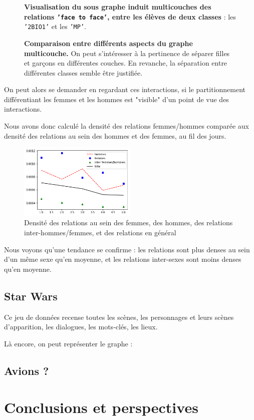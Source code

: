 \documentclass[11pt,a4paper]{article}
\theoremstyle{definition}
\theoremstyle{remark}
\theoremstyle{remark}
\begin{document}
\begin{figure}[H]
\begin{minipage}[t]{0.48\textwidth}
		\captionsetup{margin=10pt}
		\caption{\textbf{Visualisation du sous graphe induit multicouches des relations \texttt{'face to face'}, entre les élèves de deux classes} : les \texttt{'2BIO1'} et les \texttt{'MP'}.}
	\end{minipage}
	\label{induit}
	\caption{\textbf{Comparaison entre différents aspects du graphe multicouche. } On peut s'intéresser à la pertinence de séparer filles et garçons en différentes couches. En revanche, la séparation entre différentes classes semble être justifiée.}
\end{figure}
	
	On peut alors se demander en regardant ces interactions, si le partitionnement différentiant les femmes et les hommes est "visible" d'un point de vue des interactions.

Nous avons donc calculé la densité des relations femmes/hommes comparée aux densité des relations au sein des hommes et des femmes, au fil des jours.

\begin{figure}[H]
	\centering
	\includegraphics[width=0.5\textwidth]{compfg.png}
	\caption{Densité des relations au sein des femmes, des hommes, des relations inter-hommes/femmes, et des relations en général}
	\label{densitesemaine}
\end{figure}

Nous voyons qu'une tendance se confirme : les relations sont plus denses au sein d'un même sexe qu'en moyenne, et les relations inter-sexes sont moins denses qu'en moyenne.



\subsection{Star Wars}

Ce jeu de données recense toutes les scènes, les personnages et leurs scènes d'apparition, les dialogues, les mots-clés, les lieux.

Là encore, on peut représenter le graphe : 

\subsection{Avions ?}

\section{Conclusions et perspectives}

    \nocite{*}
    
	
\end{document}

